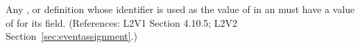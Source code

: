 Any \Compartment, \Species or \Parameter definition whose identifier is
used as the value of  in an \EventAssignment must have a
value of  for its  field.  (References: 
L2V1 Section 4.10.5; L2V2 Section~\ref{sec:eventassignment}.)
